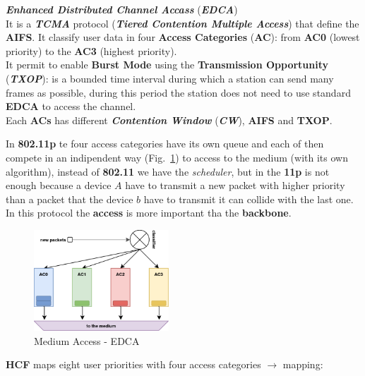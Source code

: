 \begin{boxA}
    \textbf{\textit{Enhanced Distributed Channel Accass}} (\textbf{\textit{EDCA}}) \\
    It is a \textbf{\textit{TCMA}} protocol (\textbf{\textit{Tiered Contention Multiple Access}}) that define the \textbf{AIFS}. It classify user data in four \textbf{Access Categories} (\textbf{AC}): from \textbf{AC0} (lowest priority) to the \textbf{AC3} (highest priority). \\
    It permit to enable \textbf{Burst Mode} using the \textbf{\textbf{Transmission Opportunity}} (\textbf{\textit{TXOP}}): is a bounded time interval during which a station can send many frames as possible, during this period the station does not need to use standard \textbf{EDCA} to access the channel. \\
    Each \textbf{ACs} has different \textbf{\textit{Contention Window}} (\textbf{\textit{CW}}), \textbf{AIFS} and \textbf{TXOP}.
\end{boxA}
In \textbf{802.11p} te four access categories have its own queue and each of then compete in an indipendent way (Fig.~\ref{fig:edca}) to access to the medium (with its own algorithm), instead of \textbf{802.11} we have the \textit{scheduler}, but in the \textbf{11p} is not enough because a device $A$ have to transmit a new packet with higher priority than a packet that the device $b$ have to transmit it can collide with the last one. In this protocol the \textbf{access} is more important tha the \textbf{backbone}.

\begin{figure}[h]
    \centering
    \includegraphics[width=0.45\textwidth]{img/edca}
    \caption{Medium Access - EDCA}
    \label{fig:edca}
\end{figure}
\textbf{HCF} maps eight user priorities with four access categories $\rightarrow$ mapping:

